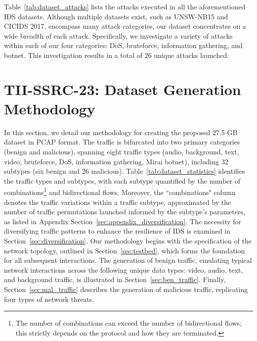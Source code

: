 \documentclass[lettersize,journal]{IEEEtran}
\begin{document}
Table~\ref{tab:dataset_attacks} lists the attacks executed in all the aforementioned \ac{IDS} datasets. Although multiple datasets exist, such as UNSW-NB15 and CICIDS 2017, encompass many attack categories, our dataset concentrates on a wide breadth of each attack. Specifically, we investigate a variety of attacks within each of our four categories: \ac{DoS}, bruteforce, information gathering, and botnet. This investigation results in a total of 26 unique attacks launched.


\section{TII-SSRC-23: Dataset Generation Methodology}\label{sec:dataset}
In this section, we detail our methodology for creating the proposed 27.5 GB dataset in \ac{PCAP} format. The traffic is bifurcated into two primary categories (benign and malicious), spanning eight traffic types (audio, background, text, video, bruteforce, \ac{DoS}, information gathering, Mirai botnet), including 32 subtypes (six benign and 26 malicious). 
Table~\ref{tab:dataset_statistics} identifies the traffic types and subtypes, with each subtype quantified by the number of combinations\footnote{The number of combinations can exceed the number of bidirectional flows; this strictly depends on the protocol and how they are terminated.} and bidirectional flows. Moreover, the ``combinations" column denotes the traffic variations within a traffic subtype, approximated by the number of traffic permutations launched informed by the subtype's parameters, as listed in Appendix Section~\ref{sec:appendix_diversification}. 
The necessity for diversifying traffic patterns to enhance the resilience of \ac{IDS} is examined in Section~\ref{sec:diversification}. Our methodology begins with the specification of the network topology, outlined in Section~\ref{sec:testbed}, which forms the foundation for all subsequent interactions. The generation of benign traffic, emulating typical network interactions across the following unique data types: video, audio, text, and background traffic, is illustrated in Section~\ref{sec:ben_traffic}. Finally, Section~\ref{sec:mal_traffic} describes the generation of malicious traffic, replicating four types of network threats. 
\end{document}
